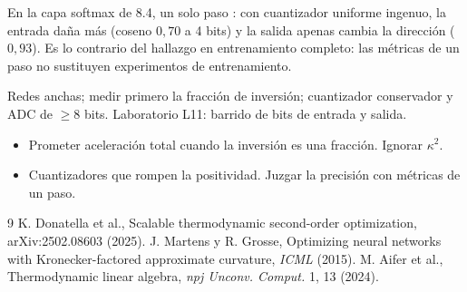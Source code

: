 \documentclass[11pt,a4paper]{article}
\begin{document}
\begin{ejemplo}
En la capa softmax de 8.4, un solo paso \evS: con cuantizador uniforme ingenuo, la entrada daña más (coseno $0{,}70$ a 4 bits) y la salida apenas cambia la dirección
($0{,}93$). Es lo contrario del hallazgo en entrenamiento completo: las métricas de un paso no sustituyen experimentos de entrenamiento.
\end{ejemplo}

\begin{aplicacion}
Redes anchas; medir primero la fracción de inversión; cuantizador conservador y ADC de $\ge8$ bits. Laboratorio L11: barrido de bits de entrada y salida.
\end{aplicacion}

\begin{error}
\begin{itemize}[nosep]
\item Prometer aceleración total cuando la inversión es una fracción. \quad Ignorar $\kappa^2$.
\item Cuantizadores que rompen la positividad. \quad Juzgar la precisión con métricas de un paso.
\end{itemize}
\end{error}

\begin{thebibliography}{9}\small
{} K. Donatella et al., Scalable thermodynamic second-order optimization, arXiv:2502.08603 (2025).
 J. Martens y R. Grosse, Optimizing neural networks with Kronecker-factored approximate curvature, \emph{ICML} (2015).
 M. Aifer et al., Thermodynamic linear algebra, \emph{npj Unconv. Comput.} 1, 13 (2024).
\end{thebibliography}
\end{document}
